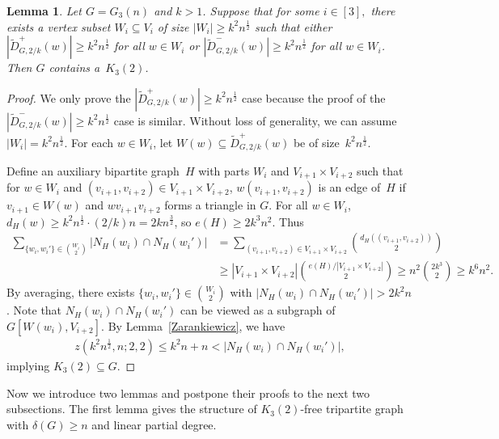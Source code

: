 \documentclass[11pt]{article}
\newtheorem{lemma}[theorem]{Lemma}
\numberwithin{equation}{section}
\begin{document}
	
	\begin{lemma}\label{proposition: upper bound for N^+G,alpha}
		Let $G=G_3(n)$ and $k > 1$.
		Suppose that for some $i\in [3],$ there exists a vertex subset $W_i\subseteq V_i$ of size $|W_i|\geq k^2n^{\frac12}$ such that either $|\widetilde{D}^+_{G,2/k}(w)|\geq k^2n^{\frac{1}{2}}$ for all $w\in W_i$ or $|\widetilde{D}^-_{G,2/k}(w)|\geq k^2n^{\frac{1}{2}}$ for all $w\in W_i$. Then $G$ contains a~$K_3(2)$.
	\end{lemma}
	\begin{proof}
		We only prove the $|\widetilde{D}^+_{G,2/k}(w)|\geq k^2n^{\frac{1}{2}}$ case because the proof of the $|\widetilde{D}^-_{G,2/k}(w)|\geq k^2n^{\frac{1}{2}}$ case is similar. Without loss of generality, we can assume $|W_i| = k^2 n^{\frac{1}{2}}$.
		For each $w\in W_i$, let $W(w)\subseteq \widetilde{D}^+_{G,2/k} (w)$ be of size~$k^2n^{\frac{1}{2}}$. 
		
		Define an auxiliary bipartite graph~$H$ with parts $W_i$ and $V_{i+1}\times V_{i+2}$ such that for $w\in W_i$ and $(v_{i+1},v_{i+2}) \in V_{i+1}\times V_{i+2}$, $w(v_{i+1},v_{i+2})$ is an edge of~$H$ if $v_{i+1}\in W(w)$ and $wv_{i+1}v_{i+2}$ forms a triangle in $G$.
			For all $w\in W_i$, $d_H(w) \geq k^2 n^{\frac{1}{2}} \cdot (2/k) n = 2 k n^{\frac{3}{2}}$, so $e(H)\geq 2k^{3}n^2$.
		Thus
		\begin{equation*}
			\begin{aligned}
				\sum\limits_{\{w_i,w_i'\}\in \binom{W_i}{2}}|N_H(w_i)\cap N_H(w_i')| &=  \sum\limits_{(v_{i+1},v_{i+2})\in V_{i+1}\times V_{i+2}}\binom{d_H\left((v_{i+1},v_{i+2})\right)}{2}\\
				& \geq |V_{i+1}\times V_{i+2}|\binom{e(H)/|V_{i+1}\times V_{i+2}|}{2}
				\geq n^2\binom{2k^3}{2}
				\geq k^6n^2.
			\end{aligned}
		\end{equation*}
		By averaging, there exists $\{w_i,w_i'\} \in \binom{W_i}{2}$ with $|N_H(w_i)\cap N_H(w_i')|> 2k^2n$.
		Note that $N_H(w_i)\cap N_H(w_i')$ can be viewed as a subgraph of $G[W(w_i),V_{i+2}]$.
		By Lemma~\ref{Zarankiewicz}, we have 
		\begin{align*}
			z\left(k^2 n^{\frac{1}{2}},n;2,2\right)\leq k^2n+n < |N_H(w_i)\cap N_H(w_i')|,
		\end{align*}
		implying $K_3(2)\subseteq G$.
	\end{proof}
	
	Now we introduce two lemmas and postpone their proofs to the next two subsections. The first lemma gives the structure of $K_3(2)$-free tripartite graph with $\delta(G)\geq n$ and linear partial degree. 
	
\end{document}
